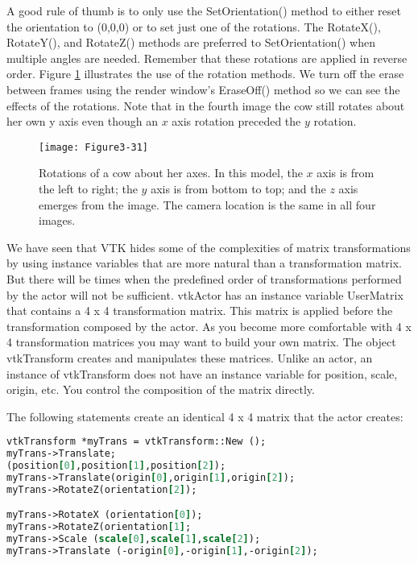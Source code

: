 A good rule of thumb is to only use the SetOrientation() method to either reset the orientation to (0,0,0) or to set just one of the rotations. The RotateX(), RotateY(), and RotateZ() methods are preferred to SetOrientation() when multiple angles are needed. Remember that these rotations are applied in reverse order. Figure \ref{fig:Figure3-31} illustrates the use of the rotation methods. We turn off the erase between frames using the render window’s EraseOff() method so we can see the effects of the rotations. Note that in the fourth image the cow still rotates about her own y axis even though an $x$ axis rotation preceded the $y$ rotation.

\begin{figure}[!htb]
  \centering
  \texttt{[image: Figure3-31]}\\
  \caption{Rotations of a cow about her axes. In this model, the $x$ axis is from the left to right; the $y$ axis is from bottom to top; and the $z$ axis emerges from the image. The camera location is the same in all four images.}\label{fig:Figure3-31}
\end{figure}


We have seen that VTK hides some of the complexities of matrix transformations by using instance variables that are more natural than a transformation matrix. But there will be times when the predefined order of transformations performed by the actor will not be sufficient. vtkActor has an instance variable UserMatrix that contains a 4 x 4 transformation matrix. This matrix is applied before the transformation composed by the actor. As you become more comfortable with 4 x 4 transformation matrices you may want to build your own matrix. The object vtkTransform creates and manipulates these matrices. Unlike an actor, an instance of vtkTransform does not have an instance variable for position, scale, origin, etc. You control the composition of the matrix directly.

The following statements create an identical 4 x 4 matrix that the actor creates:

\begin{lstlisting}[language=TCL, caption={}]
vtkTransform *myTrans = vtkTransform::New ();
myTrans->Translate;
(position[0],position[1],position[2]);
myTrans->Translate(origin[0],origin[1],origin[2]);
myTrans->RotateZ(orientation[2]);

myTrans->RotateX (orientation[0]);
myTrans->RotateZ(orientation[1]; 
myTrans->Scale (scale[0],scale[1],scale[2]);
myTrans->Translate (-origin[0],-origin[1],-origin[2]);
\end{lstlisting}

